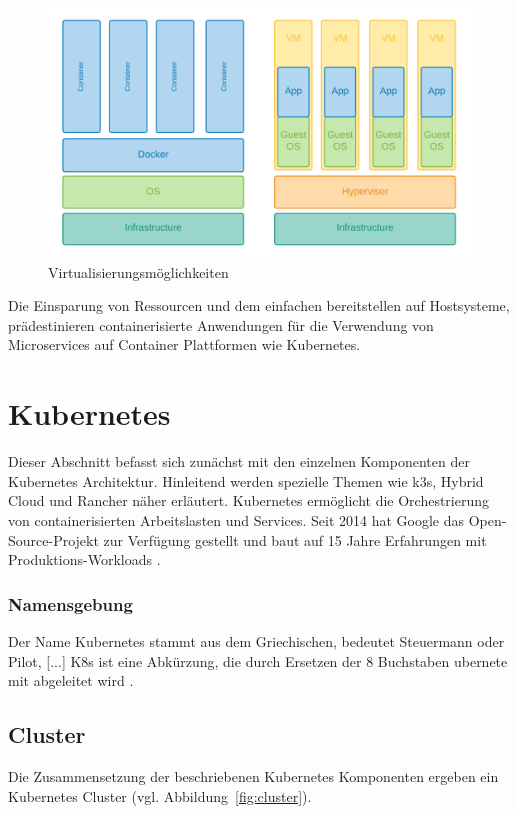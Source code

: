 \begin{figure}
    \centering
    \includegraphics[width=1.0\columnwidth]{images/Container-VM.png}
    \caption{Virtualisierungsmöglichkeiten \protect}
    \label{fig:containervm}
\end{figure}

Die Einsparung von Ressourcen und dem einfachen bereitstellen auf Hostsysteme,
prädestinieren containerisierte Anwendungen für die Verwendung von Microservices
auf Container Plattformen wie Kubernetes.


\section{Kubernetes}

Dieser Abschnitt befasst sich zunächst mit den einzelnen Komponenten der Kubernetes Architektur.
Hinleitend werden spezielle Themen wie k3s, Hybrid Cloud und Rancher näher erläutert.
Kubernetes ermöglicht die Orchestrierung von containerisierten Arbeitslasten
und Services. Seit 2014 hat Google das Open-Source-Projekt zur Verfügung
gestellt und baut auf 15 Jahre Erfahrungen mit Produktions-Workloads \cite{kubernetes}.

\subsubsection{Namensgebung}
\glqq Der Name Kubernetes stammt aus dem Griechischen, bedeutet Steuermann oder Pilot, [...]
K8s ist eine Abkürzung, die durch Ersetzen der 8 Buchstaben \glqq ubernete\grqq{} mit \grqq{} abgeleitet wird\grqq{} \cite{kubernetes}.

\subsection{Cluster}
Die Zusammensetzung der beschriebenen Kubernetes Komponenten ergeben ein Kubernetes Cluster (vgl. Abbildung~\ref{fig:cluster}).


